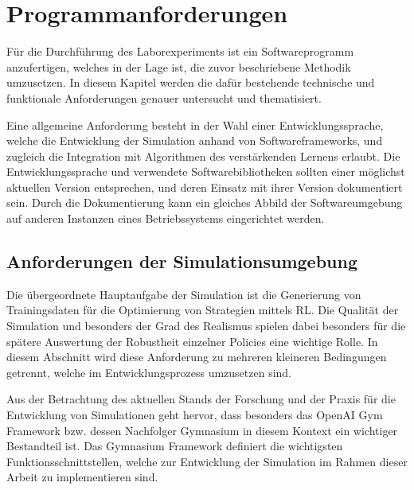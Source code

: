 \section{Programmanforderungen}

Für die Durchführung des Laborexperiments ist ein Softwareprogramm anzufertigen, welches in der Lage ist, die zuvor beschriebene Methodik umzusetzen.
In diesem Kapitel werden die dafür bestehende technische und funktionale Anforderungen genauer untersucht und thematisiert. 

Eine allgemeine Anforderung besteht in der Wahl einer Entwicklungssprache, welche die Entwicklung der Simulation anhand von Softwareframeworks, und zugleich die Integration mit Algorithmen des verstärkenden Lernens erlaubt.
Die Entwicklungssprache und verwendete Softwarebibliotheken sollten einer möglichst aktuellen Version entsprechen, und deren Einsatz mit ihrer Version dokumentiert sein.
Durch die Dokumentierung kann ein gleiches Abbild der Softwareumgebung auf anderen Instanzen eines Betriebssystems eingerichtet werden. 

\subsection{Anforderungen der Simulationsumgebung}

Die übergeordnete Hauptaufgabe der Simulation ist die Generierung von Trainingsdaten für die Optimierung von Strategien mittels RL.
Die Qualität der Simulation und besonders der Grad des Realismus spielen dabei besonders für die spätere Auswertung der Robustheit einzelner Policies eine wichtige Rolle.
In diesem Abschnitt wird diese Anforderung zu mehreren kleineren Bedingungen getrennt, welche im Entwicklungsprozess umzusetzen sind.

Aus der Betrachtung des aktuellen Stands der Forschung und der Praxis für die Entwicklung von Simulationen geht hervor, dass besonders das OpenAI Gym Framework bzw. dessen Nachfolger Gymnasium in diesem Kontext ein wichtiger Bestandteil ist.
Das Gymnasium Framework definiert die wichtigsten Funktionsschnittstellen, welche zur Entwicklung der Simulation im Rahmen dieser Arbeit zu implementieren sind.

